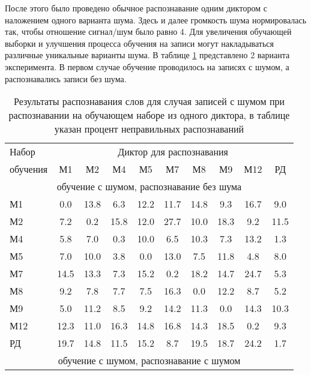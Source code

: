 После этого было проведено обычное распознавание одним диктором с наложением одного варианта шума.
Здесь и далее громкость шума нормировалась так, чтобы отношение сигнал/шум было равно 4.
Для увеличения обучающей выборки и улучшения процесса обучения на записи могут накладываться различные уникальные варианты шума.
В таблице \ref{tab:cnn_1noise_1dictor} представлено 2 варианта эксперимента.
В первом случае обучение проводилось на записях с шумом, а распознавались записи без шума.

\begin{table}[h]
	\centering
	\caption{Результаты распознавания слов для случая записей с шумом при распознавании на обучающем наборе из одного диктора, в таблице указан процент неправильных распознаваний}
	\label{tab:cnn_1noise_1dictor}
	\begin{tabular}{| l | c | c | c | c | c | c | c | c | c |}
		\hline
		Набор & \multicolumn{9}{c|}{Диктор для распознавания} \\
		\hhline{~---------}
		обучения\phantom{00} & \phantom{0}М1\phantom{0} & \phantom{0}М2\phantom{0} & \phantom{0}М4\phantom{0} & \phantom{0}М5\phantom{0} & \phantom{0}М7\phantom{0} & \phantom{0}М8\phantom{0} & \phantom{0}М9\phantom{0} & \phantom{0}М12\phantom{0} & \phantom{0}РД\phantom{0} \\
		\hline
		\multicolumn{10}{|c|}{обучение с шумом, распознавание без шума} \\
		\hline
		М1		 &  0.0 & 13.8 &  6.3 & 12.2 & 11.7 & 14.8 &  9.3 & 16.7 &  9.0 \\
		М2		 &  7.2 &  0.2 & 15.8 & 12.0 & 27.7 & 10.0 & 18.3 &  9.2 & 11.5 \\
		М4		 &  5.8 &  7.0 &  0.3 & 10.0 &  6.5 & 10.3 &  7.3 & 13.2 &  1.3 \\
		М5		 &  7.0 & 10.0 &  3.8 &  0.0 & 13.0 &  7.5 & 11.8 &  4.8 &  8.0 \\
		М7		 & 14.5 & 13.3 &  7.3 & 15.2 &  0.2 & 18.2 & 14.7 & 24.7 &  5.3 \\
		М8		 &  9.2 &  7.8 &  7.7 &  7.5 & 16.3 &  0.0 & 12.2 &  8.7 &  5.2 \\
		М9		 &  5.0 & 11.2 &  8.5 &  9.2 & 14.2 & 11.3 &  0.0 & 14.3 & 10.3 \\
		М12		 & 12.3 & 11.0 & 16.3 & 14.8 & 16.8 & 14.3 & 18.5 &  0.2 &  9.3 \\
		РД		 & 19.7 & 14.8 & 11.5 & 15.2 &  8.7 & 19.5 & 18.7 & 24.2 &  1.7 \\
		\hline
		\multicolumn{10}{|c|}{обучение с шумом, распознавание с шумом} \\

\end{tabular}
\end{table}
